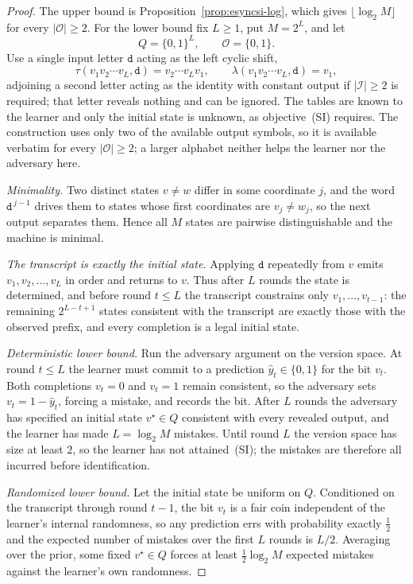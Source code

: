 \documentclass[12pt]{article}
\theoremstyle{definition}
\begin{document}
\begin{proof}
The upper bound is Proposition~\ref{prop:esyncsi-log}, which gives
$\lfloor\log_2M\rfloor$ for every $|\mathcal O|\ge2$.  For the lower bound fix
$L\ge1$, put $M=2^L$, and let
\[
Q=\{0,1\}^L,
\qquad
\mathcal O=\{0,1\}.
\]
Use a single input letter $\mathtt d$ acting as the left cyclic shift,
\[
\tau(v_1v_2\cdots v_L,\mathtt d)=v_2\cdots v_Lv_1,
\qquad
\lambda(v_1v_2\cdots v_L,\mathtt d)=v_1 ,
\]
adjoining a second letter acting as the identity with constant output if
$|\mathcal I|\ge2$ is required; that letter reveals nothing and can be ignored.
The tables are known to the learner and only the initial state is unknown, as
objective~(SI) requires.  The construction uses only two of the available
output symbols, so it is available verbatim for every $|\mathcal O|\ge2$; a
larger alphabet neither helps the learner nor the adversary here.

\emph{Minimality.}  Two distinct states $v\ne w$ differ in some coordinate $j$,
and the word $\mathtt d^{\,j-1}$ drives them to states whose first coordinates
are $v_j\ne w_j$, so the next output separates them.  Hence all $M$ states are
pairwise distinguishable and the machine is minimal.

\emph{The transcript is exactly the initial state.}  Applying $\mathtt d$
repeatedly from $v$ emits $v_1,v_2,\dots,v_L$ in order and returns to $v$.
Thus after $L$ rounds the state is determined, and before round $t\le L$ the
transcript constrains only $v_1,\dots,v_{t-1}$: the remaining $2^{L-t+1}$
states consistent with the transcript are exactly those with the observed
prefix, and every completion is a legal initial state.

\emph{Deterministic lower bound.}  Run the adversary argument on the version
space.  At round $t\le L$ the learner must commit to a prediction
$\widehat y_t\in\{0,1\}$ for the bit $v_t$.  Both completions $v_t=0$ and
$v_t=1$ remain consistent, so the adversary sets $v_t=1-\widehat y_t$, forcing
a mistake, and records the bit.  After $L$ rounds the adversary has specified
an initial state $v^\star\in Q$ consistent with every revealed output, and the
learner has made $L=\log_2M$ mistakes.  Until round $L$ the version space has
size at least $2$, so the learner has not attained~(SI); the mistakes are
therefore all incurred before identification.

\emph{Randomized lower bound.}  Let the initial state be uniform on $Q$.
Conditioned on the transcript through round $t-1$, the bit $v_t$ is a fair coin
independent of the learner's internal randomness, so any prediction errs with
probability exactly $\tfrac12$ and the expected number of mistakes over the
first $L$ rounds is $L/2$.  Averaging over the prior, some fixed
$v^\star\in Q$ forces at least $\tfrac12\log_2M$ expected mistakes against the
learner's own randomness.


\end{proof}
\end{document}
